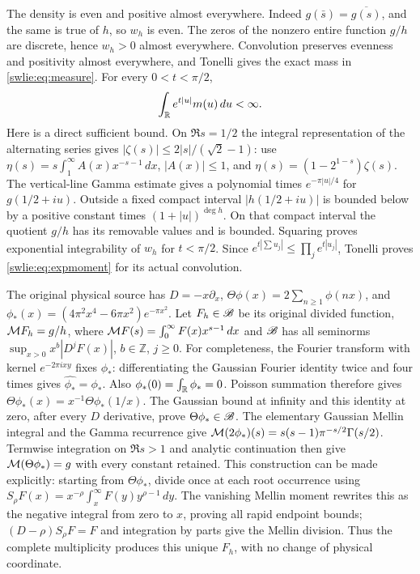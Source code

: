 The density is even and positive almost everywhere. Indeed
$g(\bar s)=\overline{g(s)}$, and the same is true of $h$,
so $w_h$ is even. The zeros of the nonzero entire function
$g/h$ are discrete, hence $w_h>0$ almost everywhere.
Convolution preserves evenness and positivity almost everywhere,
and Tonelli gives the exact mass in \eqref{swlie:eq:measure}.
For every $0<t<\pi/2$,
\begin{equation}\label{swlie:eq:expmoment}
 \int_\mathbb R e^{t|u|}m(u)\,du<\infty.
\end{equation}
Here is a direct sufficient bound. On $\Re s=1/2$ the integral
representation of the alternating series gives
$|\zeta(s)|\leq2|s|/(\sqrt2-1)$: use
$\eta(s)=s\int_1^\infty A(x)x^{-s-1}\,dx$, $|A(x)|\leq1$,
and $\eta(s)=(1-2^{1-s})\zeta(s)$.
The vertical-line Gamma estimate gives a polynomial times
$e^{-\pi|u|/4}$ for $g(1/2+iu)$. Outside a fixed compact interval
$|h(1/2+iu)|$ is bounded below by a positive constant times
$(1+|u|)^{\deg h}$. On that compact interval the quotient
$g/h$ has its removable values and is bounded. Squaring proves
exponential integrability of $w_h$ for $t<\pi/2$.
Since $e^{t|\sum u_j|}\leq\prod_j e^{t|u_j|}$, Tonelli proves
\eqref{swlie:eq:expmoment} for its actual convolution.

The original physical source has $D=-x\partial_x$,
$\Theta\phi(x)=2\sum_{n\geq1}\phi(nx)$, and
$\phi_*(x)=(4\pi^2x^4-6\pi x^2)e^{-\pi x^2}$.
Let $F_h\in\mathscr B$ be its original divided function,
$\mathcal M F_h=g/h$, where $\mathcal M F(s)=\int_0^\infty F(x)x^{s-1}\,dx$
and $\mathscr B$ has all seminorms
$\sup_{x>0}x^b|D^jF(x)|$, $b\in\mathbb Z$, $j\geq0$.
For completeness, the Fourier transform with kernel
$e^{-2\pi ixy}$ fixes $\phi_*$: differentiating the Gaussian
Fourier identity twice and four times gives
$\widehat{\phi_*}=\phi_*$. Also $\phi_*(0)=\int_\mathbb R\phi_*=0$.
Poisson summation therefore gives
$\Theta\phi_*(x)=x^{-1}\Theta\phi_*(1/x)$.
The Gaussian bound at infinity and this identity at zero,
after every $D$ derivative, prove $\Theta\phi_*\in\mathscr B$.
The elementary Gaussian Mellin integral and the Gamma
recurrence give
$\mathcal M(2\phi_*)(s)=s(s-1)\pi^{-s/2}\Gamma(s/2)$.
Termwise integration on $\Re s>1$ and analytic continuation
then give $\mathcal M(\Theta\phi_*)=g$ with every constant retained.
This construction can be made explicitly: starting from
$\Theta\phi_*$, divide once at each root occurrence using
$S_\rho F(x)=x^{-\rho}\int_x^\infty F(y)y^{\rho-1}\,dy$.
The vanishing Mellin moment rewrites this as the negative
integral from zero to $x$, proving all rapid endpoint bounds;
$(D-\rho)S_\rho F=F$ and integration by parts give the Mellin
division. Thus the complete multiplicity produces this
unique $F_h$, with no change of physical coordinate.


